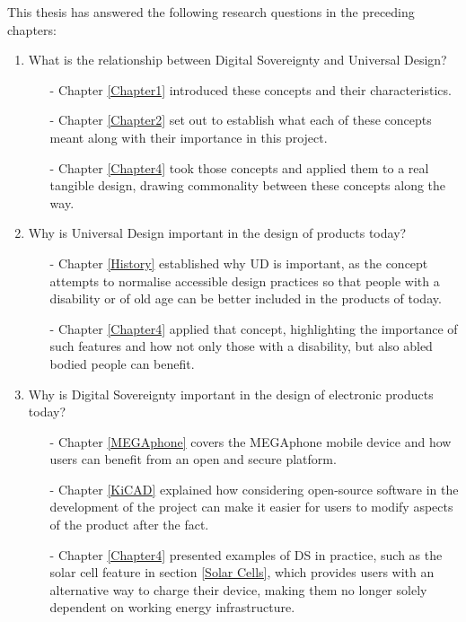 This thesis has answered the following research questions in the preceding chapters:
\begin{enumerate}
    \item What is the relationship between Digital Sovereignty and Universal Design?
        \begin{enumerate}
        \item[-] Chapter \ref{Chapter1} introduced these concepts and their characteristics.
        \item[-] Chapter \ref{Chapter2} set out to establish what each of these concepts meant along with their importance in this project.
        \item[-] Chapter \ref{Chapter4} took those concepts and applied them to a real tangible design, drawing commonality between these concepts along the way.
        \end{enumerate} 
    \item Why is Universal Design important in the design of products today?
        \begin{enumerate}
        \item[-] Chapter \ref{History} established why UD is important, as the concept attempts to normalise accessible design practices so that people with a disability or of old age can be better included in the products of today.
        \item[-] Chapter \ref{Chapter4} applied that concept, highlighting the importance of such features and how not only those with a disability, but also abled bodied people can benefit. 
        \end{enumerate}
    \item Why is Digital Sovereignty important in the design of electronic products today?
        \begin{enumerate}
        \item[-] Chapter \ref{MEGAphone} covers the MEGAphone mobile device and how users can benefit from an open and secure platform.
        \item[-] Chapter \ref{KiCAD} explained how considering open-source software in the development of the project can make it easier for users to modify aspects of the product after the fact.
        \item[-] Chapter \ref{Chapter4} presented examples of DS in practice, such as the solar cell feature in section \ref{Solar Cells}, which provides users with an alternative way to charge their device, making them no longer solely dependent on working energy infrastructure.
        \end{enumerate} 

\end{enumerate}
